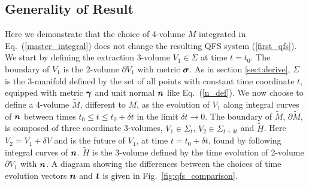 \subsection{Generality of Result} \label{sect:generality}
Here we demonstrate that the choice of 4-volume $M$ integrated in Eq.~(\ref{master_integral}) does not change the resulting QFS system (\ref{first_qfs}). We start by defining the extraction 3-volume $V_1\in\Sigma$ at time $t=t_0$. The boundary of $V_1$ is the 2-volume $\partial V_1$ with metric $\boldsymbol{\sigma}$. As in section \ref{sect:derive}, $\Sigma$ is the 3-manifold defined by the set of all points with constant time coordinate $t$, equipped with metric $\boldsymbol{\gamma}$ and unit normal $\boldsymbol{n}$ like Eq.~(\ref{n_def}). We now choose to define a 4-volume $\tilde{M}$, different to $M$, as the evolution of $V_1$ along integral curves of $\boldsymbol{n}$ between times $t_0 \leq t \leq t_0 + \delta t$ in the limit $\delta t \rightarrow 0$. The boundary of $\tilde{M}$, $\partial \tilde M$, is composed of three coordinate 3-volumes, $V_1\in\Sigma_t$, $V_2\in\Sigma_{t+\delta t}$ and $\tilde{H}$. Here $V_2=V_1 + \delta V$ and is the future of $V_1$, at time $t=t_0 +\delta t$, found by following integral curves of $\boldsymbol{n}$. $\tilde{H}$ is the 3-volume defined by the time evolution of 2-volume $\partial V_1$ with $\boldsymbol{n}$. A diagram showing the differences between the choices of time evolution vectors $\boldsymbol{n}$ and $\boldsymbol{t}$ is given in Fig.~\ref{fig:qfs_comparison}.


